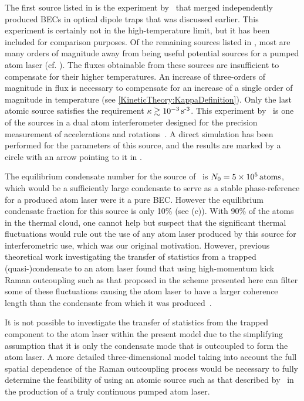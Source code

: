 The first source listed in  is the experiment by~\citet{Chikkatur:2002qa} that merged independently produced BECs in optical dipole traps that was discussed earlier.  This experiment is certainly not in the high-temperature limit, but it has been included for comparison purposes.  Of the remaining sources listed in , most are many orders of magnitude away from being useful potential sources for a pumped atom laser (cf. ).  The fluxes obtainable from these sources are insufficient to compensate for their higher temperatures. An increase of three-orders of magnitude in flux is necessary to compensate for an increase of a single order of magnitude in temperature (see \eqref{KineticTheory:KappaDefinition}).  Only the last atomic source satisfies the requirement $\kappa \gtrsim \unit[10^{-3}]{s\textsuperscript{-3}}$.  This experiment by~\citet{Muller:2007} is one of the sources in a dual atom interferometer designed for the precision measurement of accelerations and rotations~\citep{Muller:2009}.  A direct simulation has been performed for the parameters of this source, and the results are marked by a circle with an arrow pointing to it in .  

The equilibrium condensate number for the source of~\citet{Muller:2007} is $N_0 = \unit[5 \times 10^5]{atoms}$, which would be a sufficiently large condensate to serve as a stable phase-reference for a produced atom laser were it a pure BEC.  However the equilibrium condensate fraction for this source is only 10\% (see (c)).  With 90\% of the atoms in the thermal cloud, one cannot help but suspect that the significant thermal fluctuations would rule out the use of any atom laser produced by this source for interferometric use, which was our original motivation.  However, previous theoretical work investigating the transfer of statistics from a trapped (quasi-)condensate to an atom laser found that using high-momentum kick Raman outcoupling such as that proposed in the scheme presented here can filter some of these fluctuations causing the atom laser to have a larger coherence length than the condensate from which it was produced~\citep{Proukakis:2003}.  

It is not possible to investigate the transfer of statistics from the trapped component to the atom laser within the present model due to the simplifying assumption that it is only the condensate mode that is outcoupled to form the atom laser.  A more detailed three-dimensional model taking into account the full spatial dependence of the Raman outcoupling process would be necessary to fully determine the feasibility of using an atomic source such as that described by~\citet{Muller:2007} in the production of a truly continuous pumped atom laser.

